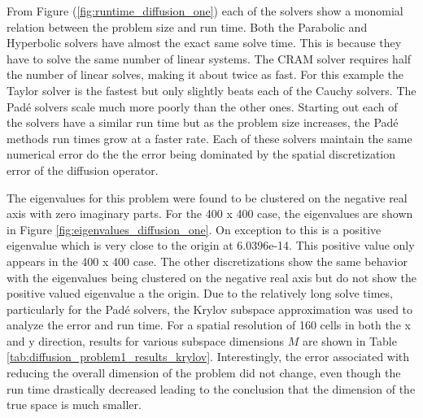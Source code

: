 From Figure (\ref{fig:runtime_diffusion_one}) each of the solvers show a monomial relation between the problem size and run time. Both the Parabolic and Hyperbolic solvers have almost the exact same solve time. This is because they have to solve the same number of linear systems. The CRAM solver requires half the number of linear solves, making it about twice as fast. For this example the Taylor solver is the fastest but only slightly beats each of the Cauchy solvers. The Pad\'e solvers scale much more poorly than the other ones. Starting out each of the solvers have a similar run time but as the problem size increases, the Pad\'e methods run times grow at a faster rate. Each of these solvers maintain the same numerical error do the the error being dominated by the spatial discretization error of the diffusion operator. 

The eigenvalues for this problem were found to be clustered on the negative real axis with zero imaginary parts. For the 400 x 400 case, the eigenvalues are shown in Figure \ref{fig:eigenvalues_diffusion_one}.  On exception to this is a positive eigenvalue which is very close to the origin at 6.0396e-14. This positive value only appears in the 400 x 400 case. The other discretizations show the same behavior with the eigenvalues being clustered on the negative real axis but do not show the positive valued eigenvalue a the origin. Due to the relatively long solve times, particularly for the Pad\'e solvers, the Krylov subspace approximation was used to analyze the error and run time. For a spatial resolution of 160 cells in both the x and y direction, results for various subspace dimensions $M$ are shown in Table \ref{tab:diffusion_problem1_results_krylov}. Interestingly, the error associated with reducing the overall dimension of the problem did not change, even though the run time drastically decreased leading to the conclusion that the dimension of the true space is much smaller. 


\FloatBarrier

